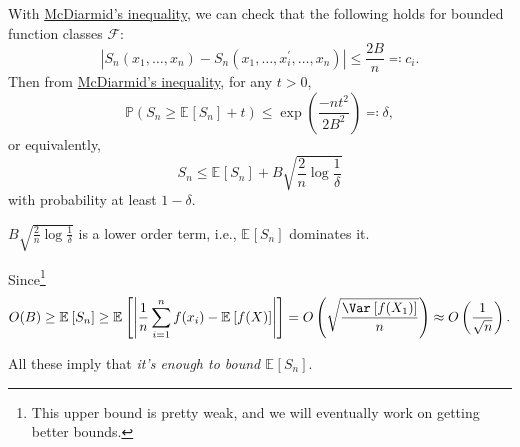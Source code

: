 With \hyperref[thm:McDiarmid-inequality]{McDiarmid's inequality}, we can check that the following holds for bounded function classes \(\mathscr{F} \):
\[
	\left\vert S_n(x_1, \dots , x_n) - S_n(x_1, \dots , x_i^{\prime} , \dots , x_n) \right\vert \leq \frac{2B}{n} \eqqcolon c_i.
\]
Then from \hyperref[thm:McDiarmid-inequality]{McDiarmid's inequality}, for any \(t > 0\),
\[
	\mathbb{P} (S_n \geq \mathbb{E}_{}\left[S_n \right] + t) \leq \exp \left( \frac{-nt^2}{2B^2} \right) \eqqcolon \delta ,
\]
or equivalently,
\[
	S_n \leq \mathbb{E}_{}\left[S_n \right] + B \sqrt{\frac{2}{n}\log \frac{1}{\delta }}
\]
with probability at least \(1 - \delta \).

\begin{note}
	\(B \sqrt{\frac{2}{n} \log \frac{1}{\delta }} \) is a lower order term, i.e., \(\mathbb{E}_{}\left[S_n \right] \) dominates it.
\end{note}
\begin{explanation}
	Since\footnote{This upper bound is pretty weak, and we will eventually work on getting better bounds. }
	\[
		O(B)
		\geq \mathbb{E}_{}\left[S_n \right]
		\geq \mathbb{E}_{}\left[\left\vert \frac{1}{n} \sum_{i=1}^{n} f(x_i) - \mathbb{E}_{}\left[f(X) \right] \right\vert \right]
		= O\left( \sqrt{\frac{\Var_{}\left[f(X_1) \right] }{n}}  \right)
		\approx O\left( \frac{1}{\sqrt{n} } \right) .
	\]
\end{explanation}

All these imply that \emph{it's enough to bound \(\mathbb{E}_{}\left[S_n \right] \)}.